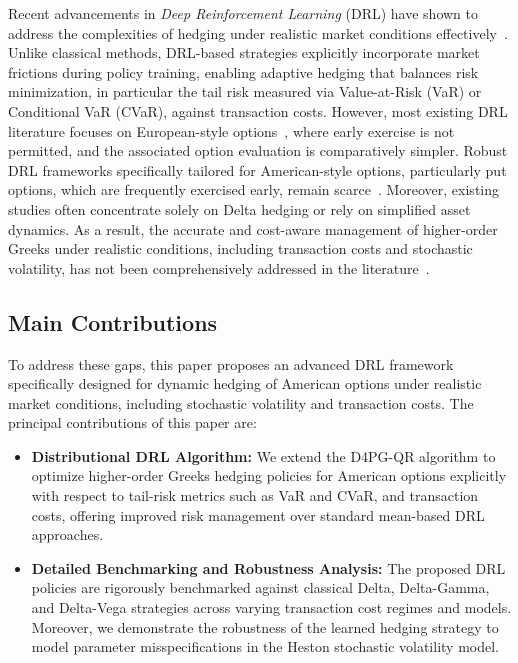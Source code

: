 \documentclass[a4paper,fleqn]{cas-dc}
\begin{document}
Recent advancements in \emph{Deep Reinforcement Learning} (DRL) have shown to address the complexities of hedging under realistic market conditions effectively~\cite{DH_R, DH_2}. Unlike classical methods, DRL-based strategies explicitly incorporate market frictions during policy training, enabling adaptive hedging that balances risk minimization, in particular the tail risk measured via Value-at-Risk (VaR) or Conditional VaR (CVaR), against transaction costs. However, most existing DRL literature focuses on European-style options~\cite{DH_01, DH_1, DH_3}, where early exercise is not permitted, and the associated option evaluation is comparatively simpler. Robust DRL frameworks specifically tailored for American-style options, particularly put options, which are frequently exercised early, remain scarce~\cite{DH_A}. Moreover, existing studies often concentrate solely on Delta hedging or rely on simplified asset dynamics. As a result, the accurate and cost-aware management of higher-order Greeks under realistic conditions, including transaction costs and stochastic volatility, has not been comprehensively addressed in the literature~\cite{buhler2019deep, zheng2023option, murray2022deep, giurca2021delta}. 

\subsection{Main Contributions}
To address these gaps, this paper proposes an advanced DRL framework specifically designed for dynamic hedging of American options under realistic market conditions, including stochastic volatility and transaction costs. The principal contributions of this paper are:

\begin{itemize}[noitemsep, left=4pt]
    \item \textbf{Distributional DRL Algorithm:} We extend the D4PG-QR algorithm \cite{DH_1} to optimize higher-order Greeks hedging policies for American options explicitly with respect to tail-risk metrics such as VaR and CVaR, and transaction costs, offering improved risk management over standard mean-based DRL approaches.

    \item \textbf{Detailed Benchmarking and Robustness Analysis:} The proposed DRL policies are rigorously benchmarked against classical Delta, Delta-Gamma, and Delta-Vega strategies across varying transaction cost regimes and models. Moreover, we demonstrate the robustness of the learned hedging strategy to model parameter misspecifications in the Heston stochastic volatility model.
\end{itemize}
\end{document}
